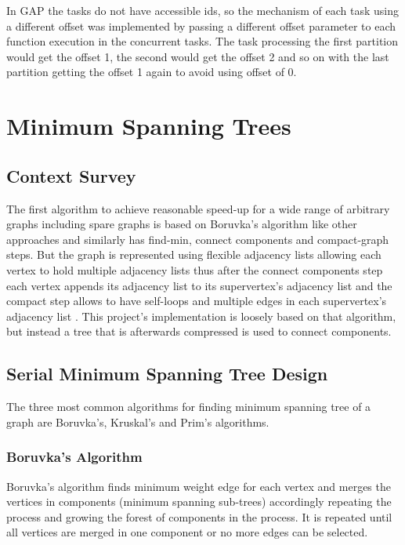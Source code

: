 \documentclass{report}
\theoremstyle{plain}
\theoremstyle{definition}
\theoremstyle{remark}
\begin{document}
In GAP the tasks do not have accessible ids, so the mechanism of each task using a different offset was implemented by passing a different offset parameter to each function execution in the concurrent tasks. The task processing the first partition would get the offset 1, the second would get the offset 2 and so on with the last partition getting the offset 1 again to avoid using offset of 0.

\chapter{Minimum Spanning Trees}

\section{Context Survey}
The first algorithm to achieve reasonable speed-up for a wide range of arbitrary graphs including spare graphs is based on Boruvka's algorithm like other approaches and similarly has find-min, connect components and compact-graph steps. But the graph is represented using flexible adjacency lists allowing each vertex to hold multiple adjacency lists thus after the connect components step each vertex appends its adjacency list to its supervertex's adjacency list and the compact step allows to have self-loops and multiple edges in each supervertex's adjacency list \cite{Bader20061366}. This project's implementation is loosely based on that algorithm, but instead a tree that is afterwards compressed is used to connect components.

\section{Serial Minimum Spanning Tree Design}

The three most common algorithms for finding minimum spanning tree of a graph are Boruvka's, Kruskal's and Prim's algorithms.

\subsection*{Boruvka's Algorithm}

Boruvka's algorithm finds minimum weight edge for each vertex and merges the vertices in components (minimum spanning sub-trees) accordingly repeating the process and growing the forest of components in the process. It is repeated until all vertices are merged in one component or no more edges can be selected.
\end{document}
